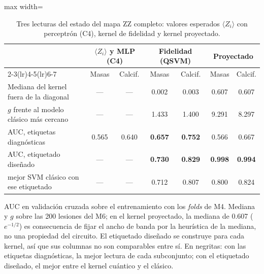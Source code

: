 \begin{table}[H]
\centering
\small
\caption{Tres lecturas del estado del mapa ZZ completo: valores esperados $\langle Z_i\rangle$ con perceptrón (C4), kernel de fidelidad y kernel proyectado.}
\label{tab:tres_lecturas}
\begin{adjustbox}{max width=\linewidth}
\begin{tabular}{l c c c c c c}
\toprule
 & \multicolumn{2}{c}{$\langle Z_i\rangle$ y MLP (C4)} & \multicolumn{2}{c}{Fidelidad (QSVM)} & \multicolumn{2}{c}{Proyectado} \\ \cmidrule(lr){2-3}\cmidrule(lr){4-5}\cmidrule(lr){6-7}
 & Masas & Calcif. & Masas & Calcif. & Masas & Calcif. \\
\midrule
Mediana del kernel fuera de la diagonal & — & — & 0.002 & 0.003 & 0.607 & 0.607 \\
$g$ frente al modelo clásico más cercano & — & — & 1.433 & 1.400 & 9.291 & 8.297 \\
AUC, etiquetas diagnósticas & 0.565 & 0.640 & \textbf{0.657} & \textbf{0.752} & 0.566 & 0.667 \\
AUC, etiquetado diseñado & — & — & \textbf{0.730} & \textbf{0.829} & \textbf{0.998} & \textbf{0.994} \\
\quad mejor SVM clásico con ese etiquetado & — & — & 0.712 & 0.807 & 0.800 & 0.824 \\
\bottomrule
\end{tabular}
\end{adjustbox}
\par\smallskip
\parbox{0.95\linewidth}{\footnotesize AUC en validación cruzada sobre el entrenamiento con los \textit{folds} de M4. Mediana y $g$ sobre las 200 lesiones del M6; en el kernel proyectado, la mediana de 0.607 ($e^{-1/2}$) es consecuencia de fijar el ancho de banda por la heurística de la mediana, no una propiedad del circuito. El etiquetado diseñado se construye para cada kernel, así que sus columnas no son comparables entre sí. En negritas: con las etiquetas diagnósticas, la mejor lectura de cada subconjunto; con el etiquetado diseñado, el mejor entre el kernel cuántico y el clásico.}
\end{table}
